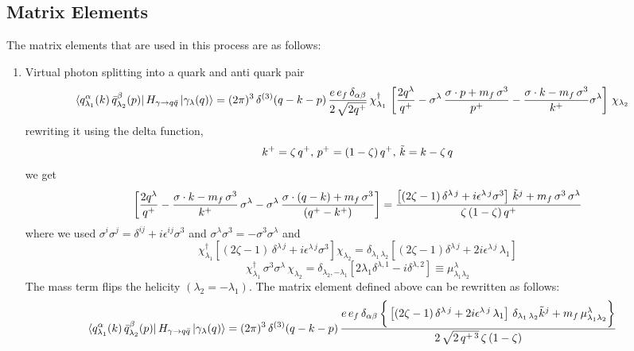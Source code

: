 \documentclass[9pt]{article}
\numberwithin{equation}{section}
\begin{document}
\subsection{Matrix Elements}
The matrix elements that are used in this process are as follows:
\begin{enumerate}
\item Virtual photon splitting into a quark and anti quark pair
\begin{align}
    \bra{q^{\alpha}_{\lambda_{1}}(k)\,\Bar{q}^{\beta}_{\lambda_{2}}(p)}H_{\gamma\rightarrow q\Bar{q}}\ket{\gamma_{\lambda}(q)} & = (2\pi)^{3}\, \delta^{(3)}(q-k-p)\, \frac{e\,e_{f}\,\delta_{\alpha\beta}}{2\,\sqrt{2q^{+}}}\, \chi^{\dagger}_{\lambda_{1}}\,\left[\frac{2q^{\lambda}}{q^{+}}-\sigma^{\lambda}\,\frac{\sigma\cdot p+m_{f}\,\sigma^{3}}{p^{+}}- \frac{\sigma\cdot k-m_{f}\,\sigma^{3}}{k^{+}}\sigma^{\lambda}\right]\,\chi_{\lambda_{2}}
\end{align}
rewriting it using the delta function,
$$k^{+} = \zeta\,q^{+}, \, p^{+} = (1-\zeta)\,q^{+}, \, \Tilde{k} = k-\zeta\,q$$
we get
$$\left[\frac{2q^{\lambda}}{q^{+}}-\frac{\sigma\cdot k - m_{f}\,\sigma^{3}}{k^{+}}\,\sigma^{\lambda}-\sigma^{\lambda}\, \frac{\sigma\cdot (q-k)+m_{f}\,\sigma^{3}}{(q^{+}-k^{+})}\right] = \frac{\left[(2\zeta -1)\,\delta^{\lambda\,j} + i\epsilon^{\lambda\, j}\sigma^{3}\right]\,\Tilde{k}^{j}+m_{f}\,\sigma^{3}\,\sigma^{\lambda}}{\zeta\,(1-\zeta)\,q^{+}}$$
where we used $\sigma^{i}\sigma^{j} = \delta^{ij} +i\epsilon^{ij}\sigma^{3}$ and $\sigma^{\lambda}\sigma^{3} = - \sigma^{3}\sigma^{\lambda}$
and $$\chi^{\dagger}_{\lambda_{1}}\left[(2\zeta -1)\,\delta^{\lambda\,j} + i\epsilon^{\lambda\, j}\sigma^{3}\right]\chi_{\lambda_{2}} = \delta_{\lambda_{1}\,\lambda_{2}}\left[(2\zeta - 1)\delta^{\lambda\,j} +2i\epsilon^{\lambda\,j}\,\lambda_{1}\right]$$
$$\chi^{\dagger}_{\lambda_{1}}\,\sigma^{3}\sigma^{\lambda}\,\chi_{\lambda_{2}} = \delta_{\lambda_{2},-\lambda_{1}} \left[2\lambda_{1}\delta^{\lambda,1} - i\delta^{\lambda,2}\right] \equiv \mu^{\lambda}_{\lambda_{1}\lambda_{2}}$$
The mass term flips the helicity $(\lambda_{2} = -\lambda_{1})$. The matrix element defined above can be rewritten as follows:
\begin{align}
    \bra{q^{\alpha}_{\lambda_{1}}(k)\,\Bar{q}^{\beta}_{\lambda_{2}}(p)}H_{\gamma\rightarrow q\Bar{q}}\ket{\gamma_{\lambda}(q)} & = (2\pi)^{3}\, \delta^{(3)}(q-k-p)\, \frac{e\,e_{f}\,\delta_{\alpha\beta}\,\bigg\{\left[(2\zeta -1)\,\delta^{\lambda\,j}+2i\epsilon^{\lambda\,j}\,\lambda_{1}\right]\,\delta_{\lambda_{1}\,\lambda_{2}}\Tilde{k}^{j}+m_{f}\,\mu^{\lambda}_{\lambda_{1}\lambda_{2}}\bigg\}}{2\,\sqrt{2\,q^{+\,3}}\, \zeta\,(1-\zeta)}

\end{align}
\end{enumerate}
\end{document}
